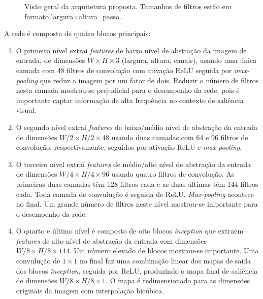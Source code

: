 \documentclass[11pt]{article}
\newcommand{\tit}[1]{\textit{#1}}
\begin{document}
\begin{figure}[H]
    \centering
    \def\svgwidth{0.9\columnwidth}
    
    \label{fig:model}
    \caption{Visão geral da arquitetura proposta.
        Tamanhos de filtros estão em formato
        largura$\times$altura\_passo.}
\end{figure}

A rede é composta de quatro blocos principais:

\begin{enumerate}
    \item O primeiro nível extrai \tit{features} de baixo nível de abstração
        da imagem de entrada, de dimensões
        $W\times H \times 3$ (largura, altura, canais), usando uma única
        camada com 48 filtros de convolução com ativação ReLU seguida por
        \tit{max-pooling} que reduz a imagem por um fator de dois.
        Reduzir o número de filtros nesta camada mostrou-se prejudicial para
        o desempenho da rede, pois é importante captar informação de
        alta frequência no contexto de saliência visual.
    \item O segundo nível extrai \tit{features} de baixo/médio nível de
        abstração da entrada de dimensões $W/2 \times H/2 \times 48$
        usando duas camadas com 64 e 96 filtros de convolução, respectivamente,
        seguidos por ativação ReLU e \tit{max-pooling}.
    \item O terceiro nível extrai \tit{features} de médio/alto nível de
        abstração da entrada de dimensões $W/4 \times H/4 \times 96$ usando
        quatro filtros de convolução.
        As primeiras duas camadas têm 128 filtros cada e as duas últimas
        têm 144 filtros cada. Toda camada de convulução é seguida de ReLU.
        \tit{Max-pooling} acontece no final.
        Um grande número de filtros neste nível mostrou-se importante para
        o desempenho da rede.
    \item O quarto e último nível é composto de oito blocos \tit{inception}
        que extraem \tit{features} de alto nível de abstração da entrada
        com dimensões $W/8 \times H/8 \times 144$.
        Um número elevado de blocos mostrou-se importante.
        Uma convulução de $1 \times 1$ no final faz uma combinação linear
        dos mapas de saída dos blocos \tit{inception}, seguida por ReLU,
        produzindo o mapa final de saliência de dimensões
        $W/8 \times H/8 \times 1$.
        O mapa é redimensionado para as dimensões originais da imagem
        com interpolação bicúbica.
\end{enumerate}
\end{document}
